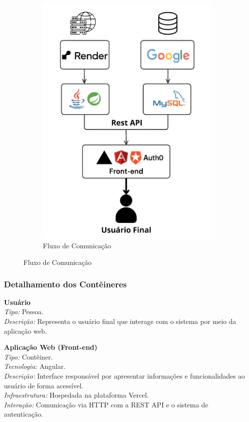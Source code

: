 \documentclass[
	article,			%
	12pt,				%
	oneside,			%
	a4paper,			%
    BIBLATEX,           %
	english,			%
	brazil,				%
	sumario=tradicional
	]{abntex2}
\begin{document}
\begin{figure}[h!]
\begin{subfigure}[b]{0.45\textwidth}
        \centering
        \includegraphics[width=\textwidth]{figuras/fluxo_comunicacao.jpg}
        \caption{Fluxo de Comunicação}
        \label{fig:fluxo-comunicacao}
    \end{subfigure}
    \label{fig:arquitetura-software}
\end{figure}

\subsubsection{Detalhamento dos Contêineres}

\textbf{Usuário}\\
\textit{Tipo:} Pessoa.\\
\textit{Descrição:} Representa o usuário final que interage com o sistema por meio da aplicação web.

\textbf{Aplicação Web (Front-end)}\\
\textit{Tipo:} Contêiner.\\
\textit{Tecnologia:} Angular.\\
\textit{Descrição:} Interface responsável por apresentar informações e funcionalidades ao usuário de forma acessível.\\
\textit{Infraestrutura:} Hospedada na plataforma Vercel.\\
\textit{Interação:} Comunicação via HTTP com a REST API e o sistema de autenticação.
\end{document}
